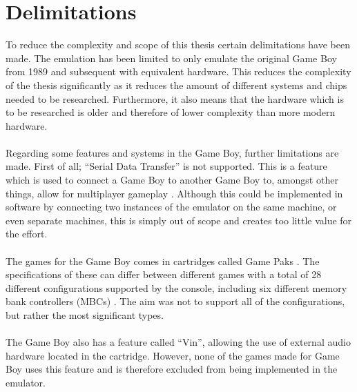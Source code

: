 \section{Delimitations}
\label{sec:Delimitations}
To reduce the complexity and scope of this thesis certain delimitations have been made.
The emulation has been limited to only emulate the original Game Boy from 1989 and subsequent with equivalent hardware. This reduces the complexity of the thesis significantly as it reduces the amount of different systems and chips needed to be researched. Furthermore, it also means that the hardware which is to be researched is older and therefore of lower complexity than more modern hardware.
\\\\
Regarding some features and systems in the Game Boy, further limitations are made. First of all; ``Serial Data Transfer'' is not supported. This is a feature which is used to connect a Game Boy to another Game Boy to, amongst other things, allow for multiplayer gameplay \cite{GBWikiSerialDataTransferTutorial}. Although this could be implemented in software by connecting two instances of the emulator on the same machine, or even separate machines, this is simply out of scope and creates too little value for the effort.
\\\\
The games for the Game Boy comes in cartridges called Game Paks \cite{gamepak}. The specifications of these can differ between different games with a total of 28 different configurations supported by the console, including six different memory bank controllers (MBCs) \cite{cartridgeType}. The aim was not to support all of the configurations, but rather the most significant types. \\\\
The Game Boy also has a feature called ``Vin'', allowing the use of external audio hardware located in the cartridge. However, none of the games made for Game Boy uses this feature \cite{pandDocsSoundControlRegisters} and is therefore excluded from being implemented in the emulator.

